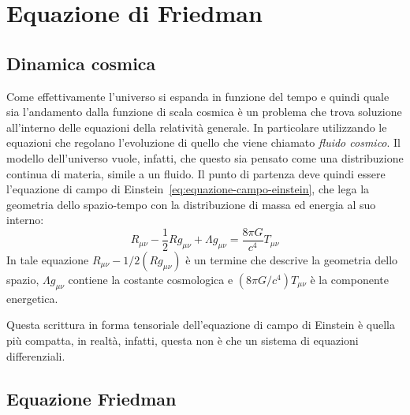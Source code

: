 \section{Equazione di Friedman}\label{sec:equazione-friedman}
\subsection{Dinamica cosmica}\label{sec:dinamica-cosmica}

Come effettivamente l'universo si espanda in funzione del tempo e quindi quale sia l'andamento dalla funzione di scala cosmica è un problema che trova soluzione all'interno delle equazioni della relatività generale. In particolare utilizzando le equazioni che regolano l'evoluzione di quello che viene chiamato \emph{fluido cosmico}. Il modello dell'universo vuole, infatti, che questo sia pensato come una distribuzione continua di materia, simile a un fluido. Il punto di partenza deve quindi essere l'equazione di campo di Einstein~\eqref{eq:equazione-campo-einstein}, che lega la geometria dello spazio-tempo con la distribuzione di massa ed energia al suo interno:
\begin{equation}\label{eq:equazione-campo-einstein}
    R_{\mu \nu} -\frac{1}{2}R g_{\mu \nu} + \Lambda g_{\mu \nu} = \frac{8\pi G}{c^4}T_{\mu \nu}
\end{equation}
In tale equazione $R_{\mu \nu}-{1}/{2}(R g_{\mu \nu})$  è un termine che descrive la geometria dello spazio, $\Lambda g_{\mu \nu}$ contiene la costante cosmologica e $({8\pi G}/{c^4})T_{\mu \nu}$ è la componente energetica.

Questa scrittura in forma tensoriale dell'equazione di campo di Einstein è quella più compatta, in realtà, infatti, questa non è che un sistema di equazioni differenziali.
\subsection{Equazione Friedman}\label{sec:sub-equazione-friedman}

